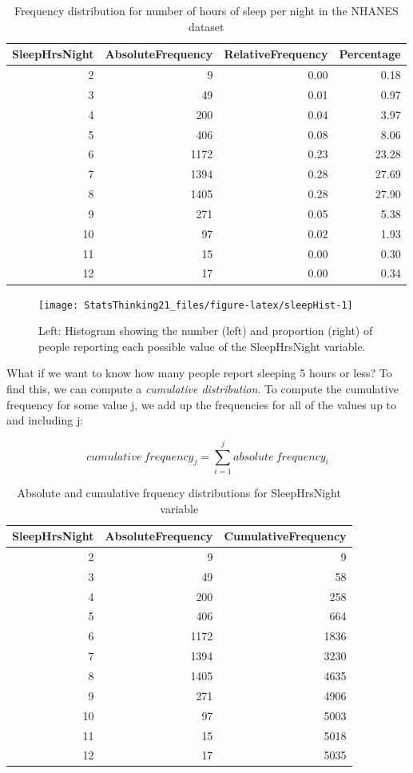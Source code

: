 \documentclass[12pt,]{book}
\theoremstyle{definition}
\theoremstyle{definition}
\theoremstyle{definition}
\theoremstyle{remark}
\begin{document}
\begin{table}

\caption{\label{tab:sleepTable}Frequency distribution for number of hours of sleep per night in the NHANES dataset}
\centering
\begin{tabular}[t]{r|r|r|r}
\hline
SleepHrsNight & AbsoluteFrequency & RelativeFrequency & Percentage\\
\hline
2 & 9 & 0.00 & 0.18\\
\hline
3 & 49 & 0.01 & 0.97\\
\hline
4 & 200 & 0.04 & 3.97\\
\hline
5 & 406 & 0.08 & 8.06\\
\hline
6 & 1172 & 0.23 & 23.28\\
\hline
7 & 1394 & 0.28 & 27.69\\
\hline
8 & 1405 & 0.28 & 27.90\\
\hline
9 & 271 & 0.05 & 5.38\\
\hline
10 & 97 & 0.02 & 1.93\\
\hline
11 & 15 & 0.00 & 0.30\\
\hline
12 & 17 & 0.00 & 0.34\\
\hline
\end{tabular}
\end{table}

\begin{figure}
\texttt{[image: StatsThinking21\_files/figure-latex/sleepHist-1]} \caption{Left: Histogram showing the number (left) and proportion (right) of people reporting each possible value of the SleepHrsNight variable.}\label{fig:sleepHist}
\end{figure}

What if we want to know how many people report sleeping 5 hours or less? To find this, we can compute a \emph{cumulative distribution}. To compute the cumulative frequency for some value j, we add up the frequencies for all of the values up to and including j:

\[
cumulative\ frequency_j = \sum_{i=1}^{j}{absolute\ frequency_i}
\]

\newpage
\begin{table}

\caption{\label{tab:unnamed-chunk-8}Absolute and cumulative frquency distributions for SleepHrsNight variable}
\centering
\begin{tabular}[t]{r|r|r}
\hline
SleepHrsNight & AbsoluteFrequency & CumulativeFrequency\\
\hline
2 & 9 & 9\\
\hline
3 & 49 & 58\\
\hline
4 & 200 & 258\\
\hline
5 & 406 & 664\\
\hline
6 & 1172 & 1836\\
\hline
7 & 1394 & 3230\\
\hline
8 & 1405 & 4635\\
\hline
9 & 271 & 4906\\
\hline
10 & 97 & 5003\\
\hline
11 & 15 & 5018\\
\hline
12 & 17 & 5035\\
\hline
\end{tabular}
\end{table}
\end{document}
